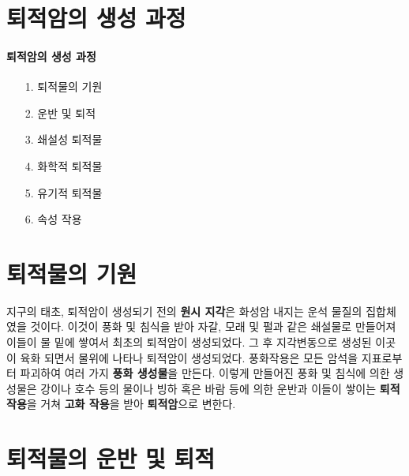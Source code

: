 \documentclass[12pt, a4paper, twoside]{book}
\begin{document}
	\clearpage
	\section{퇴적암의 생성 과정}



		\paragraph{퇴적암의 생성 과정}


				\begin{itemize}[topsep=0.0em, parsep=0.0em, itemsep=0em, leftmargin=12.0em, labelwidth=3em, labelsep=3em] 
				\item [1.] 퇴적물의 기원
				\item [2.] 운반 및 퇴적
				\item [3.] 쇄설성 퇴적물
				\item [4.] 화학적 퇴적물
				\item [5.] 유기적 퇴적물
				\item [6.] 속성 작용
				\end{itemize}




	\clearpage
	\section{퇴적물의 기원}


		지구의 태초, 퇴적암이 생성되기 전의 \textbf{원시 지각}은 화성암 내지는 운석 물질의 집합체 였을 것이다.
		이것이 풍화 및 침식을 받아 자갈, 모래 및 펄과 같은 쇄설물로 만들어져 이들이 물 밑에 쌓여서 최초의 퇴적암이 생성되었다.
		그 후 지각변동으로 생성된 이곳이 육화 되면서 물위에 나타나 퇴적암이 생성되었다. 
		풍화작용은 모든 암석을 지표로부터 파괴하여 여러 가지 \textbf{풍화 생성물}을 만든다. 
		이렇게 만들어진 풍화 및 침식에 의한 생성물은 강이나 호수 등의 물이나 빙하 혹은 바람 등에 의한 운반과 
		이들이 쌓이는 \textbf{퇴적 작용}을 거쳐 \textbf{고화 작용}을 받아 \textbf{퇴적암}으로 변한다.






	\clearpage
	\section{퇴적물의 운반 및 퇴적}
\end{document}
